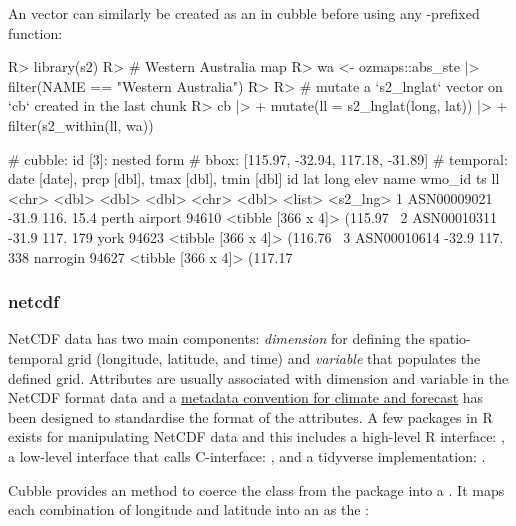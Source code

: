 \documentclass[
]{jss}
\begin{document}
An   vector can similarly be created as an  in cubble before using any -prefixed function:

\begin{CodeChunk}
\begin{CodeInput}
R> library(s2)
R> # Western Australia map
R> wa <- ozmaps::abs_ste |> filter(NAME == "Western Australia")
R> 
R> # mutate a `s2_lnglat` vector on `cb` created in the last chunk
R> cb |>
+   mutate(ll = s2_lnglat(long, lat)) |>
+   filter(s2_within(ll, wa))
\end{CodeInput}
\begin{CodeOutput}
# cubble:   id [3]: nested form
# bbox:     [115.97, -32.94, 117.18, -31.89]
# temporal: date [date], prcp [dbl], tmax [dbl], tmin [dbl]
  id            lat  long  elev name          wmo_id ts                 ll      
  <chr>       <dbl> <dbl> <dbl> <chr>          <dbl> <list>             <s2_lng>
1 ASN00009021 -31.9  116.  15.4 perth airport  94610 <tibble [366 x 4]> (115.97~
2 ASN00010311 -31.9  117. 179   york           94623 <tibble [366 x 4]> (116.76~
3 ASN00010614 -32.9  117. 338   narrogin       94627 <tibble [366 x 4]> (117.17~
\end{CodeOutput}
\end{CodeChunk}

\hypertarget{netcdf}{%
\subsubsection{netcdf}\label{netcdf}}

NetCDF data has two main components: \emph{dimension} for defining the spatio-temporal grid (longitude, latitude, and time) and \emph{variable} that populates the defined grid. Attributes are usually associated with dimension and variable in the NetCDF format data and a \href{http://cfconventions.org/}{metadata convention for climate and forecast} has been designed to standardise the format of the attributes. A few packages in R exists for manipulating NetCDF data and this includes a high-level R interface:  \citep{ncdf4}, a low-level interface that calls C-interface:  \citep{rnetcdf, michna2013rnetcdf}, and a tidyverse implementation:  \citep{tidync}.

Cubble provides an  method to coerce the  class from the  package into a . It maps each combination of longitude and latitude into an  as the :
\end{document}
